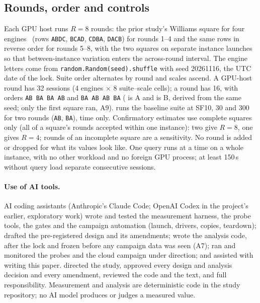 \documentclass[sigconf]{acmart}
\begin{document}
\subsection{Rounds, order and controls}
\label{sec:rounds}
Each GPU host runs $R = 8$ rounds: the prior study's Williams square for four
engines~\cite{williams1949latin} (rows \texttt{ABDC}, \texttt{BCAD}, \texttt{CDBA},
\texttt{DACB}) for rounds 1--4 and the same rows in reverse order for rounds 5--8, with the
two squares on separate instance launches so that between-instance variation enters the
across-round interval. The engine letters come from
\texttt{random.Random(seed).shuffle} with seed 20261116, the UTC date of the lock. Suite order
alternates by round and scales ascend. A GPU-host round has 32 sessions (4 engines $\times$ 8
suite--scale cells); a \CG{} round has 16, with orders \texttt{AB BA BA AB} and \texttt{BA AB AB
BA} (\sparkcpu{} is A and \polarscpu{} is B, derived from the same seed; only the first square ran, A9). \CV{} runs the
baseline suite at SF10, 30 and 300 for two rounds (\texttt{AB}, \texttt{BA}), time only.
Confirmatory estimates use complete squares only (all of a square's rounds accepted within one
instance): two give $R = 8$, one gives $R = 4$; rounds of an incomplete square are a sensitivity. No round is added or dropped for what its values
look like. One query runs at a time on a whole instance, with no other workload and no foreign
GPU process; at least 150\,s without query load separate consecutive sessions.

\paragraph{Use of AI tools.} AI coding assistants (Anthropic's Claude Code; OpenAI Codex in the
project's earlier, exploratory work) wrote and tested the measurement harness, the probe tools, the
gates and the campaign automation (launch, drivers, copies, teardown); drafted the pre-registered
design and its amendments; wrote the analysis code, after the lock and frozen before any campaign
data was seen (A7); ran and monitored the probes and the cloud campaign under
 direction; and assisted with writing this paper.  directed the
study, approved every design and analysis decision and every amendment, reviewed the code and the
text, and  full responsibility. Measurement and analysis are deterministic code
in the study repository; no AI model produces or judges a measured value.
\end{document}
